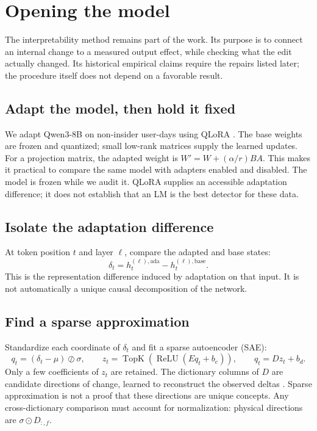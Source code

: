 \section{Opening the model}
\label{sec:method}
The interpretability method remains part of the work. Its purpose is to connect
an internal change to a measured output effect, while checking what the edit
actually changed. Its historical empirical claims require the repairs listed
later; the procedure itself does not depend on a favorable result.

\subsection{Adapt the model, then hold it fixed}
We adapt Qwen3-8B on non-insider user-days using QLoRA
\citep{qwen3,hu2022lora,dettmers2023qlora}. The base weights are frozen and
quantized; small low-rank matrices supply the learned updates. For a projection
matrix, the adapted weight is $W'=W+(\alpha/r)BA$. This makes it practical to
compare the same model with adapters enabled and disabled. The model is frozen
while we audit it. QLoRA supplies an accessible adaptation difference; it does
not establish that an LM is the best detector for these data.

\subsection{Isolate the adaptation difference}
At token position $t$ and layer $\ell$, compare the adapted and base states:
\begin{equation}
 \delta_t=h^{(\ell),\mathrm{ada}}_t-h^{(\ell),\mathrm{base}}_t.
\end{equation}
This is the representation difference induced by adaptation on that input.
It is not automatically a unique causal decomposition of the network.

\subsection{Find a sparse approximation}
Standardize each coordinate of $\delta_t$ and fit a sparse autoencoder (SAE):
\begin{equation}
 q_t=(\delta_t-\mu)\oslash\sigma,\qquad
 z_t=\operatorname{TopK}(\operatorname{ReLU}(Eq_t+b_e)),\qquad
 \widehat q_t=Dz_t+b_d.
\end{equation}
Only a few coefficients of $z_t$ are retained. The dictionary columns of $D$
are candidate directions of change, learned to reconstruct the observed deltas
\citep{cunningham2023sparse,gao2024scaling}. Sparse approximation is not a proof
that these directions are unique concepts. Any cross-dictionary comparison must
account for normalization: physical directions are $\sigma\odot D_{:,f}$.

